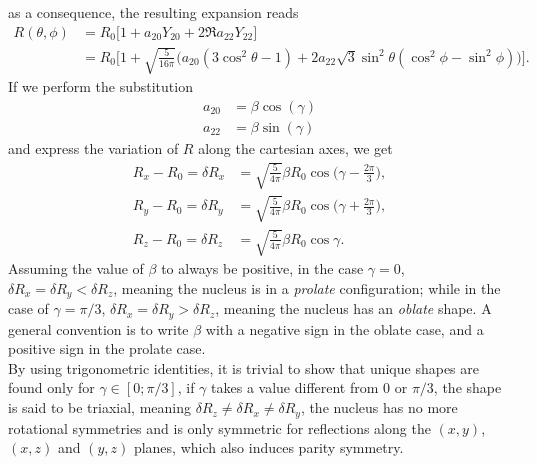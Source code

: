 as a consequence, the resulting expansion reads
\begin{align}
    R(\theta, \phi) &= R_0\bigg[1+a_{20}Y_{20}+2\Re{a_{22}Y_{22}}\bigg]\nonumber
    \\&=R_0\bigg[1+\sqrt{\frac{5}{16\pi}}\bigg(a_{20}(3\cos^2\theta-1)+ 2a_{22}\sqrt{3}\sin^2\theta(\cos^2\phi-\sin^2\phi) \bigg)\bigg].
\end{align}
If we perform the substitution 
\begin{align}
    \label{eq:a20}
    a_{20} &= \beta\cos(\gamma)
    \\  a_{22} &= \beta\sin(\gamma)\label{eq:a22}
\end{align} 
and express the variation of $R$ along the cartesian axes, we get 
\begin{align}
     R_x - R_0  =\delta R_{x}&=\sqrt{\frac{5}{4\pi}}\beta R_0 \cos\bigg(\gamma - \frac{2\pi}{3}\bigg),
    \\R_y - R_0 =\delta R_{y}&=\sqrt{\frac{5}{4\pi}}\beta R_0 \cos\bigg(\gamma + \frac{2\pi}{3}\bigg),
    \\R_z - R_0 =\delta R_{z}&=\sqrt{\frac{5}{4\pi}}\beta R_0 \cos\gamma.
\end{align}
Assuming the value of $\beta$ to always be positive, in the case $\gamma=0$, $\delta R_x = \delta R_y <\delta R_z$, meaning the nucleus is in a \textit{prolate} configuration; while in the case of $\gamma = \pi/3$, $\delta R_x = \delta R_y > \delta R_z$, meaning the nucleus has an \textit{oblate} shape. A general convention is to write $\beta$ with a negative sign in the oblate case, and a positive sign in the prolate case.
\\By using trigonometric identities, it is trivial to show that unique shapes are found only for $\gamma\in [0; \pi/3]$, if $\gamma$ takes a value different from $0$ or $\pi/3$, the shape is said to be triaxial, meaning $\delta R_z \neq \delta R_x \neq \delta R_y$, the nucleus has no more rotational symmetries and is only symmetric for reflections along the $(x, y)$, $(x, z)$ and $(y, z)$ planes, which also induces parity symmetry.
